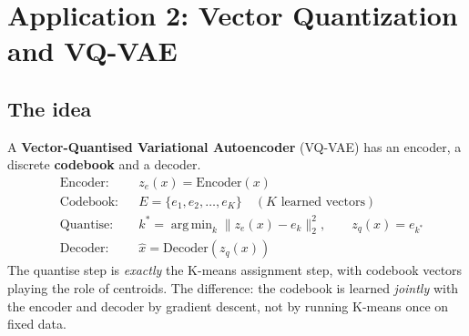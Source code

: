 \documentclass[11pt,a4paper]{article}
\DeclareMathOperator*{\argmin}{arg\,min}
\begin{document}
\section{Application 2: Vector Quantization and VQ-VAE}

\subsection{The idea}

A \textbf{Vector-Quantised Variational Autoencoder} (VQ-VAE) has an encoder, a discrete \textbf{codebook} and a decoder.
\begin{align*}
&\text{Encoder:} && z_e(x)=\mathrm{Encoder}(x)\\
&\text{Codebook:} && E=\{e_1,e_2,\dots,e_K\}\quad(\text{$K$ learned vectors})\\
&\text{Quantise:} && k^\ast=\argmin_k\|z_e(x)-e_k\|_2^2,\qquad z_q(x)=e_{k^\ast}\\
&\text{Decoder:} && \hat x=\mathrm{Decoder}(z_q(x))
\end{align*}
The quantise step is \emph{exactly} the K-means assignment step, with codebook vectors playing the role of centroids. The difference: the codebook is learned \emph{jointly} with the encoder and decoder by gradient descent, not by running K-means once on fixed data.

\begin{center}
\end{center}
\end{document}
